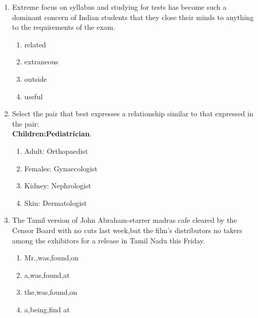 \documentclass[journal]{IEEEtran}
\begin{document}
\begin{enumerate}
    \item Extreme focus on syllabus and studying for tests has become such a dominant concern of Indian students that they close their minds to anything \underline{\hspace{1cm}} to the requirements of the exam.
    \begin{multicols}{4}
    \begin{enumerate}
        \item related
        \item extraneous
        \item outside
        \item useful
    \end{enumerate}
   \end{multicols}
    \item Select the pair that best expresses a relationship similar to that expressed in the pair:\\
    \textbf{Children:Pediatrician}.
     \begin{multicols}{2}
    \begin{enumerate}
        \item Adult: Orthopaedist
        \item Females: Gynaecologist
        \item Kidney: Nephrologist
        \item Skin: Dermatologist
    \end{enumerate}
      \end{multicols}
\item The Tamil version of \underline{\hspace{1cm}} John Abraham-starrer madras cafe \underline{\hspace{1cm}} cleared by the Censor Board with no cuts last week,but the film's distributors  \underline{\hspace{1cm}} no takers among the exhibitors for a release in Tamil Nadu \underline{\hspace{1cm}} this Friday.
 \begin{multicols}{2}
        \begin{enumerate}
        \item Mr.,was,found,on
        \item a,was,found,at
        \item the,was,found,on
        \item a,being,find at
        \end{enumerate}
      \end{multicols}

\end{enumerate}
\end{document}
